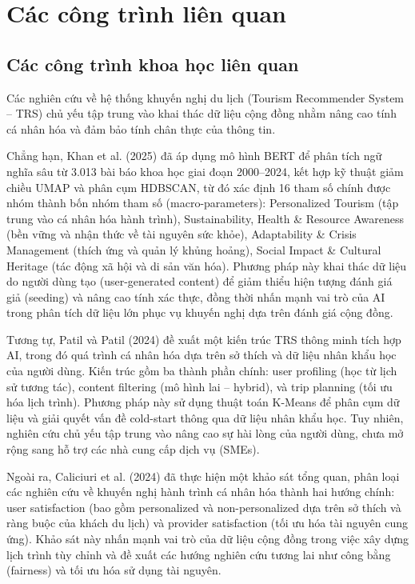 \section{Các công trình liên quan}
\subsection{Các công trình khoa học liên quan}
Các nghiên cứu về hệ thống khuyến nghị du lịch (Tourism Recommender System – TRS) chủ yếu tập trung vào khai thác dữ liệu cộng đồng nhằm nâng cao tính cá nhân hóa và đảm bảo tính chân thực của thông tin.

Chẳng hạn, Khan et al. (2025) \cite{Khan2025} đã áp dụng mô hình BERT để phân tích ngữ nghĩa sâu từ 3.013 bài báo khoa học giai đoạn 2000–2024, kết hợp kỹ thuật giảm chiều UMAP và phân cụm HDBSCAN, từ đó xác định 16 tham số chính được nhóm thành bốn nhóm tham số (macro-parameters): Personalized Tourism (tập trung vào cá nhân hóa hành trình), Sustainability, Health \& Resource Awareness (bền vững và nhận thức về tài nguyên sức khỏe), Adaptability \& Crisis Management (thích ứng và quản lý khủng hoảng), Social Impact \& Cultural Heritage (tác động xã hội và di sản văn hóa). Phương pháp này khai thác dữ liệu do người dùng tạo (user-generated content) để giảm thiểu hiện tượng đánh giá giả (seeding) và nâng cao tính xác thực, đồng thời nhấn mạnh vai trò của AI trong phân tích dữ liệu lớn phục vụ khuyến nghị dựa trên đánh giá cộng đồng.

Tương tự, Patil và Patil (2024) \cite{Patil2024} đề xuất một kiến trúc TRS thông minh tích hợp AI, trong đó quá trình cá nhân hóa dựa trên sở thích và dữ liệu nhân khẩu học của người dùng. Kiến trúc gồm ba thành phần chính: user profiling (học từ lịch sử tương tác), content filtering (mô hình lai – hybrid), và trip planning (tối ưu hóa lịch trình). Phương pháp này sử dụng thuật toán K-Means để phân cụm dữ liệu và giải quyết vấn đề cold-start thông qua dữ liệu nhân khẩu học. Tuy nhiên, nghiên cứu chủ yếu tập trung vào nâng cao sự hài lòng của người dùng, chưa mở rộng sang hỗ trợ các nhà cung cấp dịch vụ (SMEs).

Ngoài ra, Caliciuri et al. (2024) \cite{Halder2024} đã thực hiện một khảo sát tổng quan, phân loại các nghiên cứu về khuyến nghị hành trình cá nhân hóa thành hai hướng chính: user satisfaction (bao gồm personalized và non-personalized dựa trên sở thích và ràng buộc của khách du lịch) và provider satisfaction (tối ưu hóa tài nguyên cung ứng). Khảo sát này nhấn mạnh vai trò của dữ liệu cộng đồng trong việc xây dựng lịch trình tùy chỉnh và đề xuất các hướng nghiên cứu tương lai như công bằng (fairness) và tối ưu hóa sử dụng tài nguyên.

